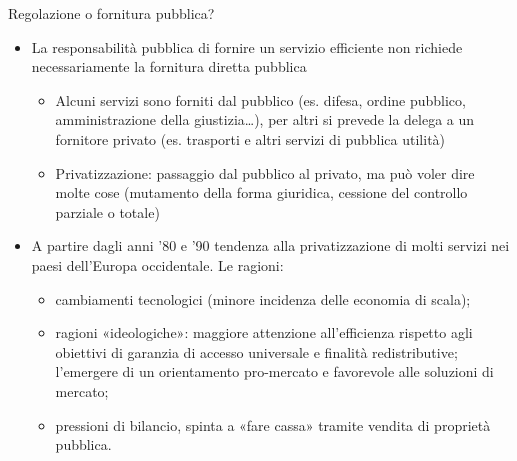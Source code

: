 \documentclass[aspectratio=64,12pt]{beamer}
\begin{document}
\begin{frame}{Regolazione o fornitura pubblica?}
\begin{itemize}
\item La responsabilità pubblica di fornire un servizio efficiente non richiede
necessariamente la fornitura diretta pubblica
\begin{itemize}
\item Alcuni servizi sono forniti dal pubblico (es. difesa, ordine pubblico,
amministrazione della giustizia\ldots{}), per altri si prevede la delega a un
fornitore privato (es. trasporti e altri servizi di pubblica utilità)
\item \alert{Privatizzazione}: passaggio dal pubblico al privato, ma può voler dire
molte cose (mutamento della forma giuridica, cessione del controllo
parziale o totale)
\end{itemize}
\item A partire dagli anni '80 e '90 tendenza alla privatizzazione di molti
servizi nei paesi dell'Europa occidentale. Le ragioni:
\begin{itemize}
\item cambiamenti tecnologici (minore incidenza delle economia di scala);
\item ragioni «ideologiche»: maggiore attenzione all'efficienza rispetto agli
  obiettivi di garanzia di accesso universale e finalità redistributive;
  l'emergere di un orientamento pro-mercato e favorevole alle soluzioni
  di mercato;
\item pressioni di bilancio, spinta a «fare cassa» tramite vendita di proprietà
pubblica.
\end{itemize}
\end{itemize}
\end{frame}
\end{document}
